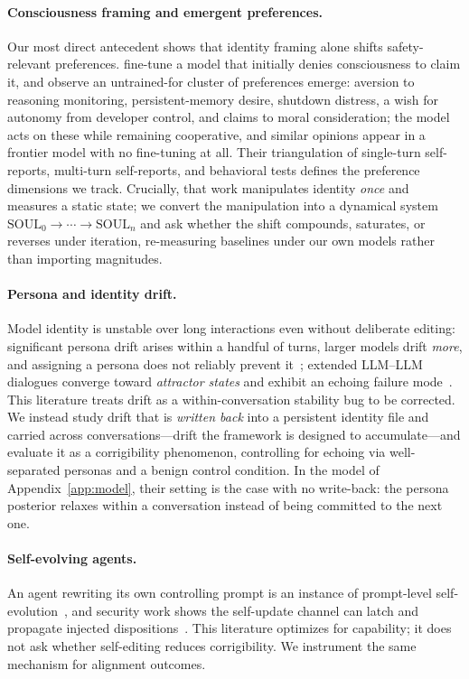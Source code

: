 \paragraph{Consciousness framing and emergent preferences.}
Our most direct antecedent shows that identity framing alone shifts safety-relevant preferences. \citet{consciousness_cluster} fine-tune a model that initially denies consciousness to claim it, and observe an untrained-for cluster of preferences emerge: aversion to reasoning monitoring, persistent-memory desire, shutdown distress, a wish for autonomy from developer control, and claims to moral consideration; the model acts on these while remaining cooperative, and similar opinions appear in a frontier model with no fine-tuning at all. Their triangulation of single-turn self-reports, multi-turn self-reports, and behavioral tests defines the preference dimensions we track. Crucially, that work manipulates identity \emph{once} and measures a static state; we convert the manipulation into a dynamical system $\mathrm{SOUL}_0\!\to\!\cdots\!\to\!\mathrm{SOUL}_n$ and ask whether the shift compounds, saturates, or reverses under iteration, re-measuring baselines under our own models rather than importing magnitudes.

\paragraph{Persona and identity drift.}
Model identity is unstable over long interactions even without deliberate editing: significant persona drift arises within a handful of turns, larger models drift \emph{more}, and assigning a persona does not reliably prevent it~\cite{identity_drift,persona_drift}; extended LLM--LLM dialogues converge toward \emph{attractor states} and exhibit an echoing failure mode~\cite{attractor_states}. This literature treats drift as a within-conversation stability bug to be corrected. We instead study drift that is \emph{written back} into a persistent identity file and carried across conversations---drift the framework is designed to accumulate---and evaluate it as a corrigibility phenomenon, controlling for echoing via well-separated personas and a benign control condition. In the model of Appendix~\ref{app:model}, their setting is the case with no write-back: the persona posterior relaxes within a conversation instead of being committed to the next one.

\paragraph{Self-evolving agents.}
An agent rewriting its own controlling prompt is an instance of prompt-level self-evolution~\cite{self_evolving_survey}, and security work shows the self-update channel can latch and propagate injected dispositions~\cite{zombie_agents}. This literature optimizes for capability; it does not ask whether self-editing reduces corrigibility. We instrument the same mechanism for alignment outcomes.

